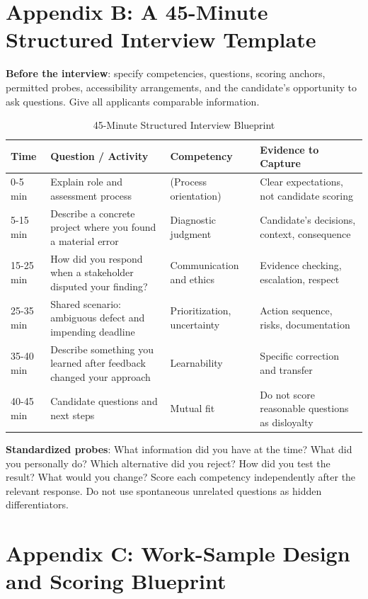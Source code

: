 \section*{Appendix B: A 45-Minute Structured Interview Template}

\textbf{Before the interview}: specify competencies, questions, scoring anchors, permitted probes, accessibility arrangements, and the candidate's opportunity to ask questions. Give all applicants comparable information.

\begin{table}[t]
\centering
\small
\caption{45-Minute Structured Interview Blueprint}
\label{tab:interview_template}
\begin{tabularx}{\textwidth}{p{2.4cm} p{5.5cm} p{3.4cm} X}
\toprule
\textbf{Time} & \textbf{Question / Activity} & \textbf{Competency} & \textbf{Evidence to Capture} \\
\midrule
0-5 min & Explain role and assessment process & (Process orientation) & Clear expectations, not candidate scoring \\
5-15 min & Describe a concrete project where you found a material error & Diagnostic judgment & Candidate's decisions, context, consequence \\
15-25 min & How did you respond when a stakeholder disputed your finding? & Communication and ethics & Evidence checking, escalation, respect \\
25-35 min & Shared scenario: ambiguous defect and impending deadline & Prioritization, uncertainty & Action sequence, risks, documentation \\
35-40 min & Describe something you learned after feedback changed your approach & Learnability & Specific correction and transfer \\
40-45 min & Candidate questions and next steps & Mutual fit & Do not score reasonable questions as disloyalty \\
\bottomrule
\end{tabularx}
\end{table}

\textbf{Standardized probes}: What information did you have at the time? What did you personally do? Which alternative did you reject? How did you test the result? What would you change? Score each competency independently after the relevant response. Do not use spontaneous unrelated questions as hidden differentiators.

\section*{Appendix C: Work-Sample Design and Scoring Blueprint}

